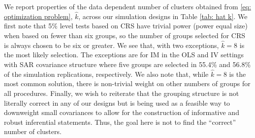 \documentclass[preprint]{imsart}
\numberwithin{equation}{section}
\theoremstyle{plain}
\theoremstyle{definition}
\renewcommand{\(}{\left(}
\renewcommand{\)}{\right)}
\renewcommand{\[}{\left[}
\renewcommand{\]}{\right]}
\renewcommand{\hat}{\widehat}
\newcommand{\G}{k}
\renewcommand{\hat}{\widehat}
\begin{document}
We report properties of the data dependent number of clusters obtained from \eqref{eq: optimization problem}, $\hat\G$, across our simulation designs in Table \ref{tab: hat k}. We first note that 5\% level tests based on CRS have trivial power (power equal size) when based on fewer than six groups, so the number of groups selected for CRS is always chosen to be six or greater. 
We see that, with two exceptions, $\hat\G = 8$ is the most likely selection. 
The exceptions are for IM in the OLS and IV settings with SAR covariance structure where five groups are selected in 55.4\% and 56.8\% of the simulation replications, respectively. 
We also note that, while $\hat\G = 8$ is the most common solution, there is non-trivial weight on other numbers of groups for all procedures. Finally, we wish to reiterate that the grouping structure is not literally correct in any of our designs but is being used as a feasible way to downweight small covariances to allow for the construction of informative and robust inferential statements. Thus, the goal here is not to find the ``correct'' number of clusters. 


\end{document}
